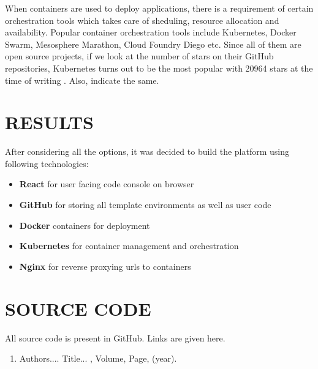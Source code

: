 \documentclass[DD]{iitmdiss}
\begin{document}
When containers are used to deploy applications, there is a requirement of certain orchestration tools which takes care of sheduling, resource allocation and availability. Popular container orchestration tools include Kubernetes, Docker Swarm, Mesosphere Marathon, Cloud Foundry Diego etc. Since all of them are open source projects, if we look at the number of stars on their GitHub repositories, Kubernetes turns out to be the most popular with 20964 stars at the time of writing \citep{github_stars_comparison}. Also, \cite{google_trends_kubernetes_docker_swarm} indicate the same.



\chapter{RESULTS}


After considering all the options, it was decided to build the platform using following technologies:
\begin{itemize}
	\item \textbf{React} for user facing code console on browser
	\item \textbf{GitHub} for storing all template environments as well as user code
	\item \textbf{Docker} containers for deployment
	\item \textbf{Kubernetes} for container management and orchestration
	\item \textbf{Nginx} for reverse proxying urls to containers
\end{itemize}



\appendix

\chapter{SOURCE CODE}

All source code is present in GitHub. Links are given here.


\begin{singlespace}
	
\end{singlespace}



\listofpapers

\begin{enumerate}  
\item Authors....  \newblock
 Title...
  , Volume,
  Page, (year).
\end{enumerate}  
\end{document}

